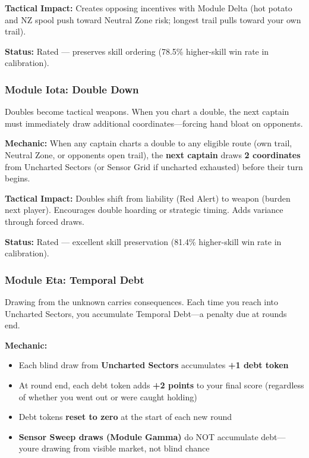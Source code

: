 \documentclass[11pt]{article}
\providecommand{\tightlist}{%
  \setlength{\itemsep}{0pt}\setlength{\parskip}{0pt}}
\begin{document}
\textbf{Tactical Impact:} Creates opposing incentives with Module Delta
(hot potato and NZ spool push toward Neutral Zone risk; longest trail
pulls toward your own trail).

\textbf{Status:} Rated --- preserves skill ordering (78.5\% higher-skill
win rate in calibration).

\subsubsection{Module Iota: Double Down}\label{module-iota-double-down}

Doubles become tactical weapons. When you chart a double, the next
captain must immediately draw additional coordinates---forcing hand
bloat on opponents.

\textbf{Mechanic:} When any captain charts a double to any eligible
route (own trail, Neutral Zone, or opponent\textquotesingle s open
trail), the \textbf{next captain} draws \textbf{2 coordinates} from Uncharted
Sectors (or Sensor Grid if uncharted exhausted) before their turn
begins.

\textbf{Tactical Impact:} Doubles shift from liability (Red Alert) to
weapon (burden next player). Encourages double hoarding or strategic
timing. Adds variance through forced draws.

\textbf{Status:} Rated --- excellent skill preservation (81.4\%
higher-skill win rate in calibration).

\subsubsection{Module Eta: Temporal Debt}\label{module-eta-temporal-debt}

Drawing from the unknown carries consequences. Each time you reach into
Uncharted Sectors, you accumulate Temporal Debt---a penalty due at
round\textquotesingle s end.

\textbf{Mechanic:}

\begin{itemize}
\tightlist
\item
  Each blind draw from \textbf{Uncharted Sectors} accumulates
  \textbf{+1 debt token}
\item
  At round end, each debt token adds \textbf{+2 points} to your final
  score (regardless of whether you went out or were caught holding)
\item
  Debt tokens \textbf{reset to zero} at the start of each new round
\item
  \textbf{Sensor Sweep draws (Module Gamma)} do NOT accumulate
  debt---you\textquotesingle re drawing from visible market, not blind
  chance
\end{itemize}
\end{document}
